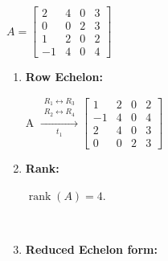 $A=
\begin{bmatrix}
    2 & 4 & 0 & 3 \\
    0 & 0 & 2 & 3 \\
    1 & 2 & 0 & 2 \\
    -1 & 4 & 0 & 4
\end{bmatrix}
$ \\[1.0em]

\begin{enumerate}
\item
    \textbf{Row Echelon:} \\[1.0em]
    \begin{answer}
        A $\xrightarrow[
            t_1
        ]{
            \substack{
                R_1 \leftrightarrow R_3 \\
                R_2 \leftrightarrow R_4
            }
        }
        \begin{bmatrix}
            1 & 2 & 0 & 2 \\
            -1 & 4 & 0 & 4 \\
            2 & 4 & 0 & 3 \\
            0 & 0 & 2 & 3
        \end{bmatrix}
        $

    \end{answer}

\item
    \textbf{Rank:}
    \begin{answer}
        $
        \operatorname{rank}(A)=4.
        $
    \end{answer} \\

\item 
    \textbf{Reduced Echelon form:} \\[1.0em]

    \begin{answer}

    \end{answer}

\end{enumerate}